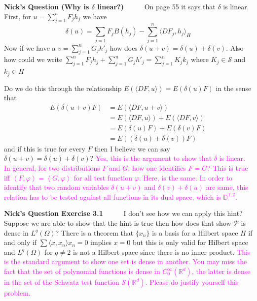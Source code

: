 \documentclass[a4paper,11pt]{article}
\numberwithin{equation}{section}
\theoremstyle{plain}
\theoremstyle{definition}
\newcommand{\InPrd}[1]{\left\langle #1 \right\rangle}
\newcommand{\R}{\mathbb{R}}
\newcounter{NQ}
\newenvironment{NickQuestion}[1][] %
{\refstepcounter{NQ}
	\begin{mdframed}[backgroundcolor=lightgray]\textbf{Nick's Question \theNQ \: #1~~}~~~\noindent}%
	{\end{mdframed}}
\numberwithin{NQ}{section}
\numberwithin{LQ}{section}
\numberwithin{ZQ}{section}
\begin{document}
\begin{NickQuestion}[(Why is $\delta$ linear?)]
	On page 55 it says that $\delta$ is linear. First, for $u=\sum_{j=1}^nF_jh_j$ we have
	\[
	\delta(u) = \sum_{j=1}F_jB(h_j) - \sum_{j=1}^n \langle DF_j, h_j \rangle_H
	\]
	Now if we have a $v = \sum_{j=1}^nG_jh'_j$ how does $\delta(u+v) = \delta(u) + \delta(v)$. Also how could we write $\sum_{j=1}^nF_jh_j + \sum_{j=1}^nG_jh'_j = \sum_{j=1}^nK_jk_j$ where $K_j \in \mathcal S$ and $k_j \in H$

	Do we do this through the relationship $E(\langle DF,u \rangle ) = E(\delta(u)F)$ in the sense that
	\begin{align*}
	E(\delta(u+v)F) &= E(\langle DF,u +v\rangle )
	\\&=  E(\langle DF,u\rangle ) +  E(\langle DF,v\rangle )
	\\& = E(\delta(u)F) + E(\delta(v)F)
	\\& = E((\delta(u)+\delta(v))F)
	\end{align*}
	and if this is true for every $F$ then I believe we can say  $\delta(u+v) = \delta(u) + \delta(v)$?
	\textcolor{magenta}{Yes, this is the argument to show that $\delta$ is linear.
	In general, for two distributions $F$ and $G$, how one identifies $F=G$? This is true iff $\InPrd{F,\varphi}=\InPrd{G,\varphi}$ for all test function $\varphi$.
	Here, is the same. In order to identify that two random variables $\delta(u+v)$ and $\delta\left(v\right)+\delta(u)$ are same, this relation has to be tested against all functions in its dual
	space, which is $\mathbb{D}^{1,2}$.}

\end{NickQuestion}

\begin{NickQuestion}[Exercise 3.1]
	I don't see how we can apply this hint? Suppose we are able to show that the hint is true then how does that show $\mathcal{P}$ is dense in $L^q(\Omega)$? There is a theorem that $\{x_n\}$ is a
	basis for a Hilbert space $H$ if and only if $\sum \langle x,x_n \rangle x_n = 0$ implies $x=0$ but this is only valid for Hilbert space and $L^q(\Omega)$ for $q \not= 2$ is not a Hilbert
	space since there is no inner product.
	\textcolor{magenta}{This is the standard argument to show one set is dense in another.
		You may miss the fact that  the set of polynomial functions is dense in $C^{\infty}_0(\R^d)$, the latter is dense in the set of the Schwatz test function
		$\mathcal{S}(\R^d)$.
	Please do justify yourself this problem.}
\end{NickQuestion}
\end{document}
